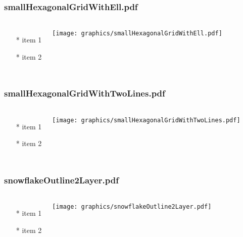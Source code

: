 \begin{frame} \frametitle{smallHexagonalGridWithEll.pdf}
    \begin{columns}[c]
        \begin{itemize}
            \item[*] item 1
            \item[*] item 2
        \end{itemize}
        \begin{minipage}{\linewidth}
            \begin{center}
            \texttt{[image: graphics/smallHexagonalGridWithEll.pdf]}
            \label{gfx:smallHexagonalGridWithEll.pdf}
            \end{center}
        \end{minipage}
    \end{columns}
\end{frame}
\begin{frame} \frametitle{smallHexagonalGridWithTwoLines.pdf}
    \begin{columns}[c]
        \begin{itemize}
            \item[*] item 1
            \item[*] item 2
        \end{itemize}
        \begin{minipage}{\linewidth}
            \begin{center}
            \texttt{[image: graphics/smallHexagonalGridWithTwoLines.pdf]}
            \label{gfx:smallHexagonalGridWithTwoLines.pdf}
            \end{center}
        \end{minipage}
    \end{columns}
\end{frame}
\begin{frame} \frametitle{snowflakeOutline2Layer.pdf}
    \begin{columns}[c]
        \begin{itemize}
            \item[*] item 1
            \item[*] item 2
        \end{itemize}
        \begin{minipage}{\linewidth}
            \begin{center}
            \texttt{[image: graphics/snowflakeOutline2Layer.pdf]}
            \label{gfx:snowflakeOutline2Layer.pdf}
            \end{center}
        \end{minipage}
    \end{columns}
\end{frame}

